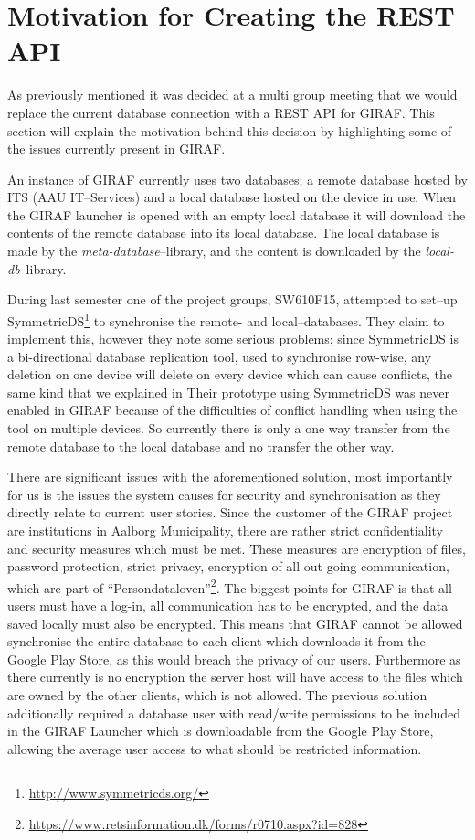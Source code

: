 \section{Motivation for Creating the REST API}\label{sec:current}

As previously mentioned it was decided at a multi group meeting that we would replace the current database connection with a REST API for GIRAF.
This section will explain the motivation behind this decision by highlighting some of the issues currently present in GIRAF.

An instance of GIRAF currently uses two databases; a remote database hosted by ITS (AAU IT--Services) and a local database hosted on the device in use.
When the GIRAF launcher is opened with an empty local database it will download the contents of the remote database into its local database.
The local database is made by the \textit{meta-database}--library, and the content is downloaded by the \textit{local-db}--library.

During last semester one of the project groups, SW610F15, attempted to set--up SymmetricDS\footnote{\url{http://www.symmetricds.org/}} to synchronise the remote- and local--databases.
They claim to implement this, however they note some serious problems; since SymmetricDS is a bi-directional database replication tool, used to synchronise row-wise, any deletion on one device will delete on every device which can cause conflicts, the same kind that we explained in 
Their prototype using SymmetricDS was never enabled in GIRAF because of the difficulties of conflict handling when using the tool on multiple devices.
So currently there is only a one way transfer from the remote database to the local database and no transfer the other way.

\bigskip
There are significant issues with the aforementioned solution, most importantly for us is the issues the system causes for security and synchronisation as they directly relate to current user stories.
Since the customer of the GIRAF project are institutions in Aalborg Municipality, there are rather strict confidentiality and security measures which must be met.
These measures are encryption of files, password protection, strict privacy, encryption of all out going communication, which are part of ``Persondataloven''\footnote{\url{https://www.retsinformation.dk/forms/r0710.aspx?id=828}}.
The biggest points for GIRAF is that all users must have a log-in, all communication has to be encrypted, and the data saved locally must also be encrypted.
This means that GIRAF cannot be allowed synchronise the entire database to each client which downloads it from the Google Play Store, as this would breach the privacy of our users.
Furthermore as there currently is no encryption the server host will have access to the files which are owned by the other clients, which is not allowed.
The previous solution additionally required a database user with read/write permissions to be included in the GIRAF Launcher which is downloadable from the Google Play Store, allowing the average user access to what should be restricted information.

